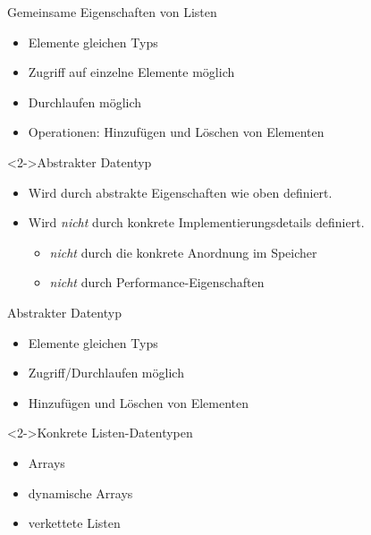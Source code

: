 \begin{frame}
    \begin{block}{Gemeinsame Eigenschaften von Listen}
        \begin{itemize}
            \item Elemente gleichen Typs
            \item Zugriff auf einzelne Elemente möglich
            \item Durchlaufen möglich
            \item Operationen: Hinzufügen und Löschen von Elementen
        \end{itemize}
    \end{block}

    \begin{block}<2->{Abstrakter Datentyp }
        \begin{itemize}
            \item Wird durch abstrakte Eigenschaften wie oben definiert.
            \item Wird \emph{nicht} durch konkrete Implementierungsdetails definiert.
            \begin{itemize}
                \item \emph{nicht} durch die konkrete Anordnung im Speicher
                \item \emph{nicht} durch Performance-Eigenschaften
            \end{itemize}
        \end{itemize}
    \end{block}
\end{frame}

\begin{frame}
    \begin{block}{Abstrakter Datentyp }
        \begin{itemize}
            \item Elemente gleichen Typs
            \item Zugriff/Durchlaufen möglich
            \item Hinzufügen und Löschen von Elementen
        \end{itemize}
    \end{block}

    \begin{block}<2->{Konkrete Listen-Datentypen}
        \begin{itemize}
            \item Arrays
            \item dynamische Arrays
            \item verkettete Listen
        \end{itemize}
    \end{block}
\end{frame}